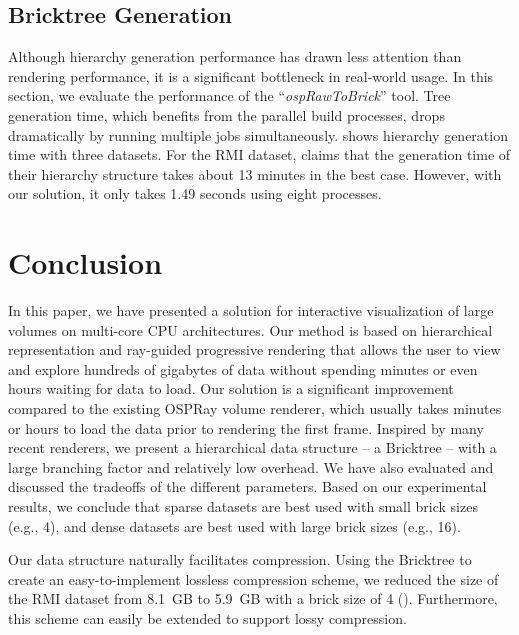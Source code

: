\subsection{Bricktree Generation}

Although hierarchy generation performance has drawn less attention than rendering
performance, it is a significant bottleneck in real-world usage\cite{fogal2013analysis}. 
In this section, we evaluate the performance of the ``\textit{ospRawToBrick}'' tool. 
Tree generation time, which benefits from the parallel build processes, drops
dramatically by running multiple jobs simultaneously.  shows
 hierarchy generation time with three datasets. For the RMI dataset, \cite{fogal2013analysis} claims that the generation time of their hierarchy structure takes
about 13 minutes in the best case. However, with our solution, it only takes 1.49 seconds using
eight processes. 


\section{Conclusion}
In this paper, we have presented a solution for interactive visualization of 
large volumes on multi-core CPU architectures. Our method is based on  
hierarchical representation and ray-guided progressive rendering that 
allows the user to view and explore hundreds of gigabytes of data without
spending minutes or even hours waiting for data to load. 
Our solution is a significant improvement compared to the existing OSPRay volume renderer,
which usually takes minutes or hours to load the data prior to rendering the first frame. 
Inspired by many recent renderers, we present a hierarchical data structure
-- a Bricktree -- with a large branching factor and relatively low overhead. We have
also evaluated and discussed the tradeoffs of the different 
parameters. Based on our experimental results, we conclude that sparse datasets 
are best used with small brick sizes (e.g., 4), and dense datasets are best used with 
large brick sizes (e.g., 16). 

Our data structure naturally facilitates compression. Using the Bricktree to create an easy-to-implement lossless compression scheme, we reduced the size of the RMI dataset from 8.1~GB to 5.9~GB with a brick size of 4 
(). Furthermore, this scheme can easily be extended to support lossy compression.

